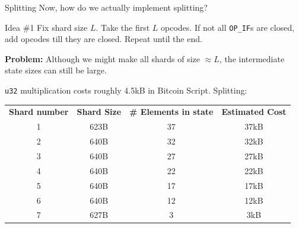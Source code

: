 \documentclass{zkdl-presentation-template}
\begin{document}
    \begin{frame}{Splitting}
        Now, how do we actually implement splitting?

        \begin{block}{Idea \#1}
            Fix shard size $L$. Take the first $L$ opcodes. If not all \texttt{OP\_IF}s are closed, add opcodes till they are closed. Repeat until the end.
        \end{block}

        \textbf{Problem:} Although we might make all shards of size $\approx L$, the intermediate state sizes can still be large.

        \begin{example}
            \texttt{u32} multiplication costs roughly 4.5kB in Bitcoin Script. Splitting:
            \begin{table}[H]
            \scriptsize
            \centering
            \begin{tabular}{cccc}
            \textbf{Shard number} & \textbf{Shard Size} & \textbf{\# Elements in state} & \textbf{Estimated Cost} \\
            1 & 623B & 37 & 37kB \\
            2 & 640B & 32 & 32kB \\
            3 & 640B & 27 & 27kB \\
            4 & 640B & 22 & 22kB \\
            5 & 640B & 17 & 17kB \\
            6 & 640B & 12 & 12kB \\
            7 & 627B & 3  & 3kB \\ 
            \end{tabular}
            \label{tab:u32_split}
            \end{table}
        \end{example}
    \end{frame}
\end{document}
